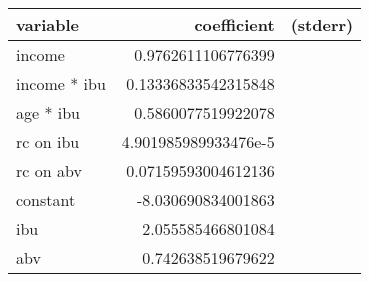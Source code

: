 \begin{tabular}{lrr}
\textbf{variable}&\textbf{coefficient}&\textbf{(stderr)}\\
\hline

income&0.9762611106776399&\\
income * ibu&0.13336833542315848&\\
age * ibu&0.5860077519922078&\\
rc on ibu&4.901985989933476e-5&\\
rc on abv&0.07159593004612136&\\
constant&-8.030690834001863&\\
ibu&2.055585466801084&\\
abv&0.742638519679622&\\
\end{tabular}

